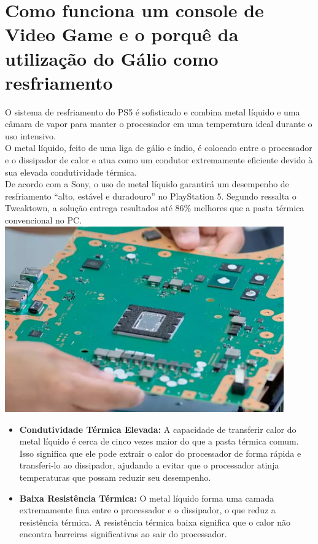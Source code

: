 \documentclass[12pt]{article}
\begin{document}
\section{Como funciona um console de Video Game e o porquê da utilização do Gálio como resfriamento}
O sistema de resfriamento do PS5 é sofisticado e combina metal líquido e uma câmara de vapor para manter o processador em uma temperatura ideal durante o uso intensivo.\\
O metal líquido, feito de uma liga de gálio e índio, é colocado entre o processador e o dissipador de calor e atua como um condutor extremamente eficiente devido à sua elevada condutividade térmica.\\
De acordo com a Sony, o uso de metal líquido garantirá um desempenho de resfriamento “alto, estável e duradouro” no PlayStation 5. Segundo ressalta o Tweaktown, a solução entrega resultados até 86\% melhores que a pasta térmica convencional no PC.\\
\begin{adjustbox}{center,caption={O metal líquido garante melhor desempenho em comparação à pasta térmica. (Imagem: PlayStation/Reprodução)},nofloat=figure,vspace=\bigskipamount}
    \centering
    \includegraphics[width=12cm]{mobo.png}
\end{adjustbox}
\begin{itemize}
    \item \textbf{Condutividade Térmica Elevada:} A capacidade de transferir calor do metal líquido é cerca de cinco vezes maior do que a pasta térmica comum. Isso significa que ele pode extrair o calor do processador de forma rápida e transferi-lo ao dissipador, ajudando a evitar que o processador atinja temperaturas que possam reduzir seu desempenho.
    \item \textbf{Baixa Resistência Térmica:} O metal líquido forma uma camada extremamente fina entre o processador e o dissipador, o que reduz a resistência térmica. A resistência térmica baixa significa que o calor não encontra barreiras significativas ao sair do processador.
\end{itemize}
\end{document}
